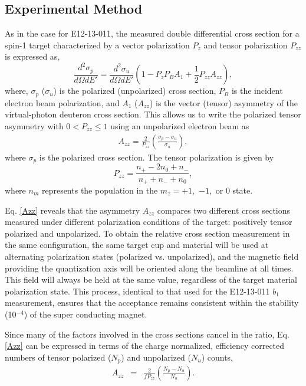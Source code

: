 \subsection{Experimental Method} %

As in the case for E12-13-011, the measured double differential cross section for a spin-1 target characterized by a vector polarization $P_{z}$ and tensor polarization
$P_{zz}$ is expressed as,
\begin{equation}
\frac{d^2\sigma_p}{d\Omega dE'}=\frac{d^2\sigma_u}{d\Omega dE'}\left(1-P_zP_BA_1+\frac{1}{2}P_{zz}A_{zz}\right),
\label{eq:one}
\end{equation}
where, $\sigma_p$ ($\sigma_u$) is the polarized (unpolarized) cross section, $P_B$ is the incident electron beam polarization, and $A_1$ ($A_{zz}$) is the
vector (tensor) asymmetry of the virtual-photon deuteron cross section.  This allows us to write
the polarized tensor asymmetry with $0<P_{zz}\leq 1$ using an unpolarized electron beam as
\begin{eqnarray}
\label{Azz}
A_{zz} = \frac{2}{P_{zz}}\left(\frac{\sigma_p - \sigma_u}{\sigma_u}\right),
\end{eqnarray}
where $\sigma_p$ is the polarized cross section. The tensor polarization is given by 
\begin{equation}
P_{zz}=\frac{n_+-2n_0+n_-}{n_++n_-+n_0},
\end{equation}
where $n_m$ represents the population in the $m_z=+1$,~$-1$,~or $0$ state.

Eq. \ref{Azz} reveals that the asymmetry $A_{zz}$ compares two different cross sections measured under different polarization conditions of the target: positively tensor polarized and unpolarized.  
To obtain the relative cross section measurement in the same configuration, the same target cup and material will be used at alternating polarization states (polarized vs. unpolarized),  and the magnetic field providing the quantization axis will be oriented along the beamline at all times.
This field will always be held at the same value, regardless of the target material polarization state. 
This process, identical to that used for the E12-13-011 $b_1$ measurement, ensures that the acceptance remains consistent within the stability (10$^{-4}$) of the super conducting magnet.  


Since many of the factors involved in the cross sections cancel in
the ratio, Eq. \ref{Azz} can be expressed in terms 
of the charge normalized, efficiency corrected numbers of tensor polarized ($N_p$) and unpolarized ($N_u$) counts, 
\begin{eqnarray} \label{3}
A_{zz}&=&\frac{2}{fP_{zz}}\left(\frac{N_p - N_u}{N_u}\right) .
\end{eqnarray}

